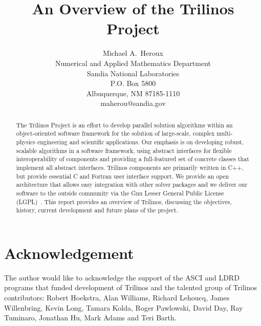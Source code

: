 \documentclass[12pt,strict]{SANDreport}
\title{An Overview of the Trilinos Project}
\author{Michael A.~Heroux\\
       Numerical and Applied Mathematics Department \\
	  Sandia National Laboratories\\
	  P.O. Box 5800\\
	  Albuquerque, NM 87185-1110 \\
	  maherou@sandia.gov \\
	 }
\date{}
\begin{document}
    \maketitle

    \begin{abstract}
The Trilinos Project is an effort to develop parallel solution algorithms within 
an object-oriented software framework for the solution of large-scale, complex
multi-physics 
engineering and scientific applications.   Our emphasis is on developing robust,
scalable algorithms in a
software framework, using abstract interfaces for flexible interoperability of
components and providing
a full-featured set of concrete classes that implement all 
abstract interfaces. Trilinos components are primarily written in C++, but provide
essential C and Fortran user 
interface support.  We provide an open architecture that allows easy integration with
other solver
packages and we deliver our software to the outside community via the Gnu Lesser
General Public License
(LGPL)~\cite{gnu-license-site}.
This report provides an overview of Trilinos, discussing the objectives, history,
current development and
future plans of the project.
    \end{abstract}


    \clearpage
    \section*{Acknowledgement}
The author would like to acknowledge the support of the ASCI and LDRD programs
that funded development of Trilinos and the talented group of Trilinos contributors: 
Robert Hoekstra, Alan Williams, Richard Lehoucq, James Willenbring, Kevin Long, Tamara
Kolda, Roger Pawlowski, David Day, Ray Tuminaro, Jonathan Hu, Mark Adams and Teri
Barth.



    \clearpage
    \tableofcontents
    \listoffigures
    \listoftables
\end{document}
